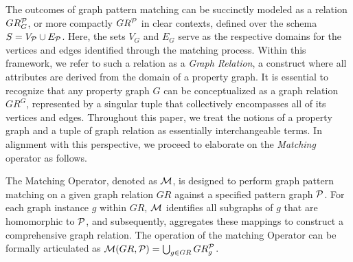 The outcomes of graph pattern matching can be succinctly modeled as a relation \(GR_G^{\mathcal{P}}\), or more compactly \(GR^{\mathcal{P}}\) in clear contexts, defined over the schema \(S = V_{\mathcal{P}} \cup E_{\mathcal{P}}\). Here, the sets \(V_G\) and \(E_G\) serve as the respective domains for the vertices and edges identified through the matching process. Within this framework, we refer to such a relation as a \emph{Graph Relation}, a construct where all attributes are derived from the domain of a property graph.
It is essential to recognize that any property graph \(G\) can be conceptualized as a graph relation \(GR^G\), represented by a singular tuple that collectively encompasses all of its vertices and edges. Throughout this paper, we treat the notions of a property graph and a tuple of graph relation as essentially interchangeable terms. In alignment with this perspective, we proceed to elaborate on the \emph{Matching} operator as follows.



\begin{definition}
    \label{def:matching}
    The Matching Operator, denoted as \(\mathcal{M}\), is designed to perform graph pattern matching on a given graph relation \(GR\) against a specified pattern graph \(\mathcal{P}\). For each graph instance \(g\) within \(GR\), \(\mathcal{M}\) identifies all subgraphs of \(g\) that are homomorphic to \(\mathcal{P}\), and subsequently, aggregates these mappings to construct a comprehensive graph relation. The operation of the matching Operator can be formally articulated as \(\mathcal{M}(GR, \mathcal{P}) = \bigcup_{g \in GR} GR_g^{\mathcal{P}}\).%
\end{definition}

